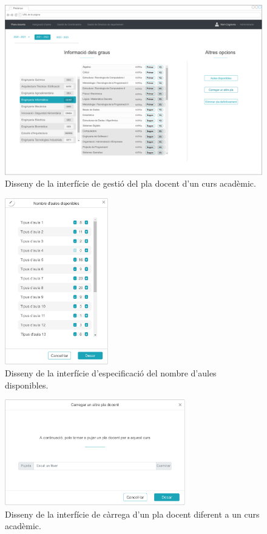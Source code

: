 \documentclass[a4paper,12pt]{ThesisStyle}
\begin{document}
\begin{figure}[H]
	\centering
	\includegraphics[width=\textwidth]{assets/interfaces/administradors/plansDocents/mainCarregat.pdf}
	\caption{\label{img:plansDocents_mainCarregat}Disseny de la interfície de gestió del pla docent d'un curs acadèmic.}
\end{figure}

\begin{figure}[H]
	\centering
	\includegraphics[width=0.4\textwidth]{assets/interfaces/administradors/plansDocents/aulesDialog.pdf}
	\caption{\label{img:plansDocents_aulesDialog}Disseny de la interfície d'especificació del nombre d'aules disponibles.}
\end{figure}

\begin{figure}[H]
	\centering
	\includegraphics[width=0.7\textwidth]{assets/interfaces/administradors/plansDocents/carregarDialog.pdf}
	\caption{\label{img:plansDocents_carregarDialog}Disseny de la interfície de càrrega d'un pla docent diferent a un curs acadèmic.}
\end{figure}
\end{document}
